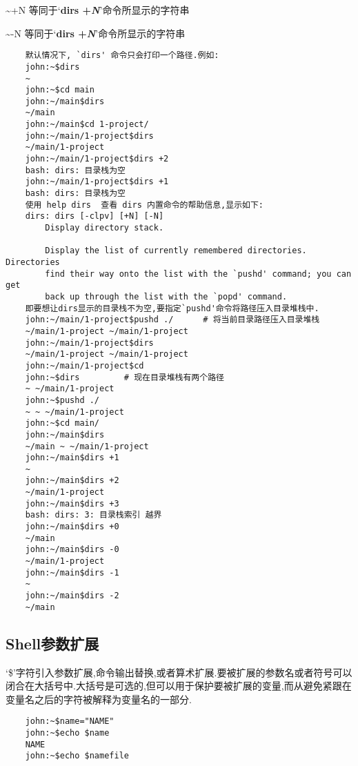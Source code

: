 \documentclass[draft,openany]{book}
\begin{document}
\begin{CJK}{UTF8}{gbsn}
\begin{basedescript}{\desclabelstyle{\nextlinelabel}\desclabelwidth{2.5em}}
    \item[\~{}+N] 等同于`\textbf{dirs +\emph{N}}'命令所显示的字符串
    \item[\~{}-N] 等同于`\textbf{dirs +\emph{N}}'命令所显示的字符串
    \end{basedescript}
    \begin{verbatim}
    默认情况下, `dirs' 命令只会打印一个路径.例如:
    john:~$dirs
    ~
    john:~$cd main
    john:~/main$dirs
    ~/main
    john:~/main$cd 1-project/
    john:~/main/1-project$dirs
    ~/main/1-project
    john:~/main/1-project$dirs +2
    bash: dirs: 目录栈为空
    john:~/main/1-project$dirs +1
    bash: dirs: 目录栈为空
    使用 help dirs  查看 dirs 内置命令的帮助信息,显示如下:
    dirs: dirs [-clpv] [+N] [-N]
        Display directory stack.

        Display the list of currently remembered directories.  Directories
        find their way onto the list with the `pushd' command; you can get
        back up through the list with the `popd' command.
    即要想让dirs显示的目录栈不为空,要指定`pushd'命令将路径压入目录堆栈中.
    john:~/main/1-project$pushd ./      # 将当前目录路径压入目录堆栈
    ~/main/1-project ~/main/1-project
    john:~/main/1-project$dirs
    ~/main/1-project ~/main/1-project
    john:~/main/1-project$cd
    john:~$dirs         # 现在目录堆栈有两个路径
    ~ ~/main/1-project
    john:~$pushd ./
    ~ ~ ~/main/1-project
    john:~$cd main/
    john:~/main$dirs
    ~/main ~ ~/main/1-project
    john:~/main$dirs +1
    ~
    john:~/main$dirs +2
    ~/main/1-project
    john:~/main$dirs +3
    bash: dirs: 3: 目录栈索引 越界
    john:~/main$dirs +0
    ~/main
    john:~/main$dirs -0
    ~/main/1-project
    john:~/main$dirs -1
    ~
    john:~/main$dirs -2
    ~/main
    \end{verbatim}

    \subsection{Shell参数扩展}
    `\$'字符引入参数扩展,命令输出替换,或者算术扩展.要被扩展的参数名或者符号可以闭合在大括号中.大括号是可选的,但可以用于保护要被扩展的变量,而从避免紧跟在变量名之后的字符被解释为变量名的一部分.
    \begin{verbatim}
    john:~$name="NAME"
    john:~$echo $name
    NAME
    john:~$echo $namefile


\end{verbatim}
\end{CJK}
\end{document}
